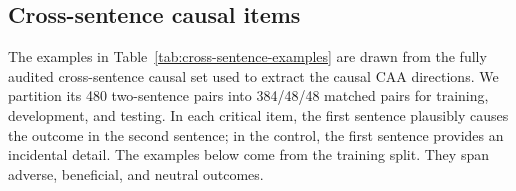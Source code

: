 \subsection{Cross-sentence causal items}
\label{app:cross-sentence-examples}

The examples in Table~\ref{tab:cross-sentence-examples} are drawn from the fully audited cross-sentence causal
set used to extract the causal CAA directions. We partition its 480
two-sentence pairs into 384/48/48 matched pairs for training, development, and
testing. In each critical item, the first sentence plausibly causes the outcome
in the second sentence; in the control, the first sentence provides an
incidental detail. The examples below come from the training split.
They span adverse, beneficial, and neutral outcomes.

